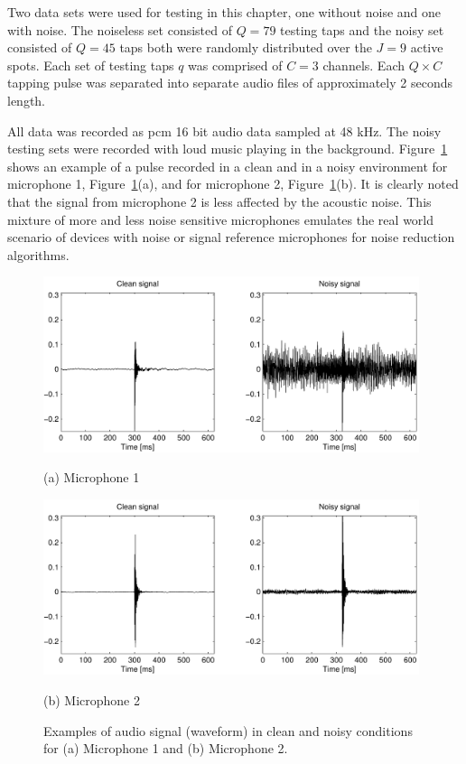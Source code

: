 Two data sets were used for testing in this chapter, one without noise and one with noise. The noiseless set consisted of $Q=79$ testing taps and the noisy set consisted of $Q=45$ taps both were randomly distributed over the $J=9$ active spots. Each set of testing taps $q$ was comprised of $C=3$ channels. Each $Q \times C$ tapping pulse was separated into separate audio files of approximately 2 seconds length.

All data was recorded as \gls{pcm} 16 bit audio data sampled at 48 kHz. The noisy testing sets were recorded with loud music playing in the background. Figure~\ref{fig:NoisyMicSignalsCompare} shows an example of a pulse recorded in a clean and in a noisy environment for microphone 1, Figure~\ref{fig:NoisyMicSignalsCompare}(a), and for microphone 2, Figure~\ref{fig:NoisyMicSignalsCompare}(b). It is clearly noted that the signal from microphone 2 is less affected by the acoustic noise. This mixture of more and less noise sensitive microphones emulates the real world scenario of devices with noise or signal reference microphones for noise reduction algorithms.

\begin{figure}[t]
\begin{minipage}[b]{1.0\linewidth}
  \centering
  \centerline{\includegraphics[width=11cm]{NoiseCompare1}}%
  \centerline{(a) Microphone 1 }\medskip
\end{minipage}
\begin{minipage}[b]{1.0\linewidth}
  \centering
  \centerline{\includegraphics[width=11cm]{NoiseCompare2}}%
  \centerline{(b) Microphone 2}\medskip
\end{minipage}
\caption{Examples of audio signal (waveform) in clean and noisy conditions for (a) Microphone 1 and (b) Microphone 2.}
\label{fig:NoisyMicSignalsCompare}
\end{figure}

